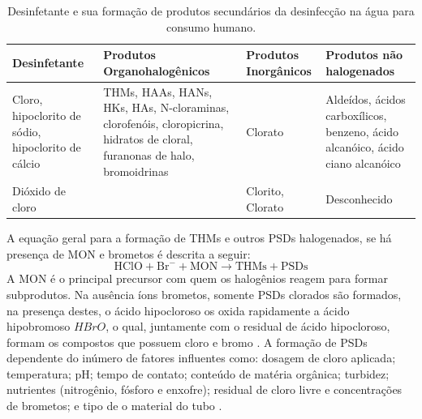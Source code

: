 \begin{table}[!htb]
\begin{flushleft}
\small
\caption{Desinfetante e sua formação de produtos secundários da desinfecção na água para consumo humano.} \label{tab:com_esp}
\begin{tabular}{p{3cm}p{5cm}p{2.5cm}p{4cm}}
\toprule
\textbf{Desinfetante} & \textbf{Produtos Organohalogênicos} & \textbf{Produtos Inorgânicos} & \textbf{Produtos não halogenados} \\
\midrule
Cloro, hipoclorito de sódio, hipoclorito de cálcio & THMs, HAAs, HANs, HKs, HAs, N-cloraminas, clorofenóis, cloropicrina, hidratos de cloral, furanonas de halo, bromoidrinas & Clorato & Aldeídos, ácidos carboxílicos, benzeno, ácido alcanóico, ácido ciano alcanóico\\ \hline

Dióxido de cloro &  & Clorito, Clorato & Desconhecido\\ 
\bottomrule
\end{tabular}
\end{flushleft}
\end{table}

A equação geral para a formação de THMs e outros PSDs halogenados, se há presença de MON e brometos é descrita a seguir: 
\begin{equation}
\mathrm{HClO}+\mathrm{Br}^{-}+\mathrm{MON}
  \rightarrow
  \mathrm{THMs} + \mathrm{PSDs} 
\end{equation}
A MON é o principal precursor com quem os halogênios reagem para formar subprodutos. Na ausência íons brometos, somente PSDs clorados são formados, na presença destes, o ácido hipocloroso os oxida rapidamente a ácido hipobromoso $HBrO$, o qual, juntamente com o residual de ácido hipocloroso, formam os compostos que possuem cloro e bromo \cite{dibernardo2017}. A formação de PSDs dependente do inúmero de fatores influentes como: dosagem de cloro aplicada; temperatura; pH; tempo de contato; conteúdo de matéria orgânica; turbidez; nutrientes (nitrogênio, fósforo e enxofre); residual de cloro livre e concentrações de brometos; e tipo de o material do tubo \cite{Abbas2014,LI2019335}.

